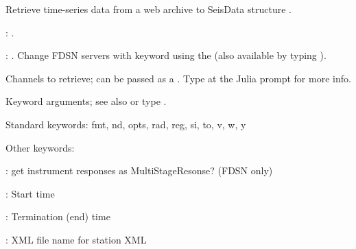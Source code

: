 \documentclass[letterpaper,11pt,english]{sphinxmanual}
\begin{document}
\begin{DUlineblock}{0em}
\item[] Retrieve time-series data from a web archive to SeisData structure .
\item[] 
\item[] 
\item[] : {\hyperref[\detokenize{src/Web/webclients:irisws}]{}}.
\item[] : {\hyperref[\detokenize{src/Web/webclients:fdsnws}]{}}. Change FDSN servers with keyword  using the {\hyperref[\detokenize{src/Appendices/web_syntax:servers}]{}} (also available by typing ).
\item[] 
\item[] 
\item[] Channels to retrieve; can be passed as a {\hyperref[\detokenize{src/Appendices/web_syntax:cid}]{}}. Type  at the Julia prompt for more info.
\item[] 
\item[] 
\item[] Keyword arguments; see also {\hyperref[\detokenize{src/Appendices/keywords:dkw}]{}} or type .
\item[] Standard keywords: fmt, nd, opts, rad, reg, si, to, v, w, y
\item[] Other keywords:
\item[] : get instrument responses as MultiStageResonse? (FDSN only)
\item[] : Start time
\item[] : Termination (end) time
\item[] : XML file name for station XML
\end{DUlineblock}
\end{document}
